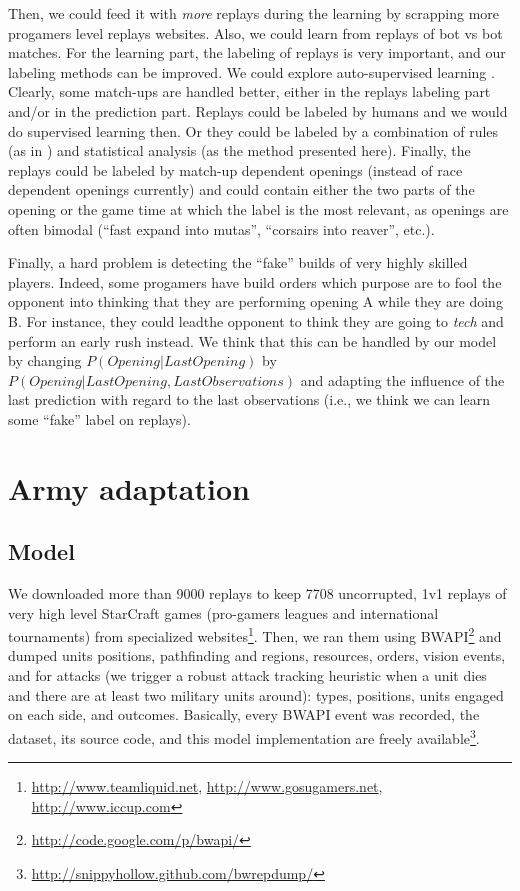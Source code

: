 Then, we could feed it with \textit{more} replays during the learning by scrapping more progamers level replays websites. Also, we could learn from replays of bot vs bot matches. For the learning part, the labeling of replays is very important, and our labeling methods can be improved. 
We could explore auto-supervised learning \citep{AutoSuperLearning}. 
Clearly, some match-ups are handled better, either in the replays labeling part and/or in the prediction part. Replays could be labeled by humans and we would do supervised learning then. Or they could be labeled by a combination of rules (as in \citep{weberStrat}) and statistical analysis (as the method presented here). Finally, the replays could be labeled by match-up dependent openings (instead of race dependent openings currently) and could contain either the two parts of the opening %
or the game time at which the label is the most relevant, as openings are often bimodal (``fast expand into mutas'', ``corsairs into reaver'', etc.).

Finally, a hard problem is detecting the ``fake'' builds of very highly skilled players. Indeed, some progamers have build orders which purpose are to fool the opponent into thinking that they are performing opening A while they are doing B. %
For instance, they could leadthe opponent to think they are going to \textit{tech} 
and perform an early rush instead. We think that this can be handled by our model by changing $P(Opening|LastOpening)$ by $P(Opening|LastOpening, LastObservations)$ and adapting the influence of the last prediction with regard to the last observations (i.e., we think we can learn some ``fake'' label on replays).

\section{Army adaptation}
\subsection{Model}
We downloaded more than 9000 replays to keep 7708 uncorrupted, 1v1 replays of very high level StarCraft games (pro-gamers leagues and international tournaments) from specialized websites\footnote{\url{http://www.teamliquid.net}, \url{http://www.gosugamers.net}, \url{http://www.iccup.com}}. Then, we ran them using BWAPI\footnote{\url{http://code.google.com/p/bwapi/}} and dumped units positions, pathfinding and regions, resources, orders, vision events, and for attacks (we trigger a robust attack tracking heuristic when a unit dies and there are at least two military units around): types, positions, units engaged on each side, and outcomes. Basically, every BWAPI event was recorded, the dataset, its source code, and this model implementation are freely available\footnote{\url{http://snippyhollow.github.com/bwrepdump/}}. 

